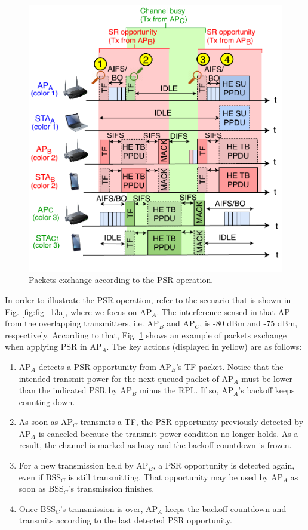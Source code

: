 \documentclass{article}
\begin{document}
\begin{figure}[ht!]
	\centering
	\includegraphics[width=.6\textwidth]{fig_13b}
	\caption{Packets exchange according to the PSR operation.}
	\label{fig:fig_13b}
\end{figure}

In order to illustrate the PSR operation, refer to the scenario that is shown in Fig. \ref{fig:fig_13a}, where we focus on $\text{AP}_A$. The interference sensed in that AP from the overlapping transmitters, i.e. $\text{AP}_B$ and $\text{AP}_C$, is -80 dBm and -75 dBm, respectively. According to that, Fig. \ref{fig:fig_13b} shows an example of packets exchange when applying PSR in $\text{AP}_A$. The key actions (displayed in yellow) are as follows:
\begin{enumerate}
	\item $\text{AP}_A$ detects a PSR opportunity from $\text{AP}_B$'s TF packet. Notice that the intended transmit power for the next queued packet of $\text{AP}_A$ must be lower than the indicated PSR by $\text{AP}_B$ minus the RPL. If so, $\text{AP}_A$'s backoff keeps counting down.
	\item As soon as $\text{AP}_C$ transmits a TF, the PSR opportunity previously detected by $\text{AP}_A$ is canceled because the transmit power condition no longer holds. As a result, the channel is marked as busy and the backoff countdown is frozen.
	\item For a new transmission held by $\text{AP}_B$, a PSR opportunity is detected again, even if $\text{BSS}_C$ is still transmitting. That opportunity may be used by $\text{AP}_A$ as soon as $\text{BSS}_C$'s transmission finishes.
	\item Once $\text{BSS}_C$'s transmission is over, $\text{AP}_A$ keeps the backoff countdown and transmits according to the last detected PSR opportunity.
\end{enumerate}
\end{document}
